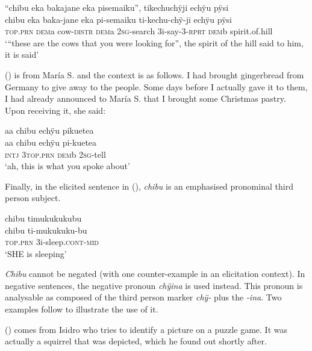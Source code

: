 \ea\label{ex:chibu-13first}
\begingl
\glpreamble “chibu eka bakajane eka pisemaiku”, tikechuchÿji echÿu pÿsi\\
\gla chibu eka baka-jane eka pi-semaiku ti-kechu-chÿ-ji echÿu pÿsi\\
\textsc{top.prn} \textsc{dem}a cow-\textsc{distr} \textsc{dem}a 2\textsc{sg}-search 3i-say-3-\textsc{rprt} \textsc{dem}b spirit.of.hill\\
\glft ‘“these are the cows that you were looking for”, the spirit of the hill said to him, it is said’
\endgl
\trailingcitation{[mxx-n151017l-1.44]}
\xe

() is from María S. and the context is as follows. I had brought gingerbread from Germany to give away to the people. Some days before I actually gave it to them, I had already announced to María S. that I brought some Christmas pastry. Upon receiving it, she said:

\ea\label{ex:chibu-12}
\begingl
\glpreamble aa chibu echÿu pikuetea\\
\gla aa chibu echÿu pi-kuetea\\
\glb \textsc{intj} 3\textsc{top.prn} \textsc{dem}b 2\textsc{sg}-tell\\
\glft ‘ah, this is what you spoke about’
\endgl
{}
\xe

Finally, in the elicited sentence in (), \textit{chibu} is an emphasised pronominal third person subject. 

\ea\label{ex:chibu-5}
\begingl
\glpreamble chibu timukukukubu\\
\gla chibu ti-mukukuku-bu\\
\textsc{top.prn} 3i-sleep.\textsc{cont}-\textsc{mid}\\
\glft ‘SHE is sleeping’
\endgl
\trailingcitation{[rxx-e181024l]}
\xe


\textit{Chibu} cannot be negated (with one counter-example in an elicitation context). In negative sentences, the negative pronoun \textit{chÿina} is used instead. This pronoun is analysable as composed of the third person marker \textit{chÿ-} plus the  \textit{-ina}. Two examples follow to illustrate the use of it.

() comes from Isidro who tries to identify a picture on a puzzle game. It was actually a squirrel that was depicted, which he found out shortly after.

